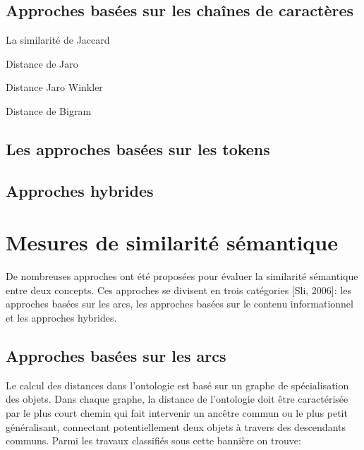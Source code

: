   \subsection{Approches basées sur les chaînes de caractères}
  \label{sec:syntactic-sim:string}

  La similarité de Jaccard

  Distance de Jaro

  Distance Jaro Winkler

  Distance de Bigram

  \subsection{Les approches basées sur les tokens}
  \label{sec:syntactic-sim:tokens}

  \subsection{Approches hybrides}
  \label{sec:syntactic-sim:hybrides}

\section{Mesures de similarité sémantique}
\label{sec:semantic-sim}

De nombreuses approches ont été proposées pour évaluer la similarité
sémantique entre deux concepts. Ces approches se divisent en trois
catégories [Sli, 2006]: les approches basées sur les arcs, les
approches basées sur le contenu informationnel et les approches
hybrides.

  \subsection{Approches basées sur les arcs}
  \label{sec:semantic-sim:arcs}

  Le calcul des distances dans l’ontologie est basé sur un graphe de
  spécialisation des objets.  Dans chaque graphe, la distance de
  l’ontologie doit être caractérisée par le plus court chemin qui fait
  intervenir un ancêtre commun ou le plus petit généralisant,
  connectant potentiellement deux objets à travers des descendants
  communs. Parmi les travaux classifiés sous cette bannière on trouve:\\

